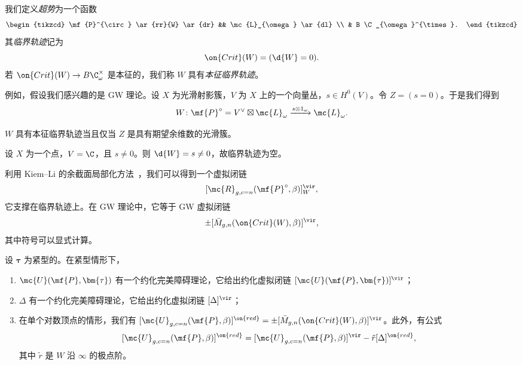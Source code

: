 我们定义\textit{超势}为一个函数
\begin{equation*}
\begin{tikzcd}
    \mf{P}^{\circ} \ar{rr}{W} \ar{dr} && \mc{L}_{\omega} \ar{dl} \\
    & B \C_{\omega}^{\times}.
\end{tikzcd}
\end{equation*}
其\textit{临界轨迹}记为
\[ \on{Crit}(W) = (\d{W} = 0). \]
若 \(\on{Crit}(W) \to B\C_{\omega}^{\times}\) 是本征的，我们称 \(W\) 具有\textit{本征临界轨迹}。

例如，假设我们感兴趣的是 GW 理论。设 \(X\) 为光滑射影簇，\(V\) 为 \(X\) 上的一个向量丛，\(s \in H^0(V)\)。令 \(Z = (s = 0)\)。于是我们得到
\[ W \colon \mf{P}^{\circ} = V^{\vee} \boxtimes \mc{L}_{\omega} \xrightarrow{s \otimes 1_{\omega}} \mc{L}_{\omega}. \]

\begin{lem}
    \(W\) 具有本征临界轨迹当且仅当 \(Z\) 是具有期望余维数的光滑簇。
\end{lem}

\begin{exm}
    设 \(X\) 为一个点，\(V = \C\)，且 \(s \neq 0\)。则 \(\d{W} = s \neq 0\)，故临界轨迹为空。
\end{exm}

利用 Kiem--Li 的余截面局部化方法~\cite{KiemLi2013}，我们可以得到一个虚拟闭链
\[ [\mc{R}_{g, c=n}(\mf{P}^{\circ}, \beta)]_W^{\vir}, \]
它支撑在临界轨迹上。在 GW 理论中，它等于 GW 虚拟闭链
\[ \pm [\bar{M}_{g,n}(\on{Crit}(W), \beta)]^{\vir}, \]
其中符号可以显式计算。

\begin{thm}
    设 \(\bm{\tau}\) 为紧型的。在紧型情形下，
    \begin{enumerate}
        \item \(\mc{U}(\mf{P}, \bm{\tau})\) 有一个约化完美障碍理论，它给出约化虚拟闭链 \([\mc{U}(\mf{P}, \bm{\tau})]^{\vir}\)；
        \item \(\Delta\) 有一个约化完美障碍理论，它给出约化虚拟闭链 \([\Delta]^{\vir}\)；
        \item 在单个对数顶点的情形，我们有 \([\mc{U}_{g, c=n}(\mf{P}, \beta)]^{\on{red}} = \pm [\bar{M}_{g,n}(\on{Crit}(W), \beta)]^{\vir}\)。此外，有公式
            \[ [\mc{U}_{g, c=n}(\mf{P}, \beta)]^{\on{red}} = [\mc{U}_{g, c=n}(\mf{P}, \beta)]^{\vir} - \tilde{r} [\Delta]^{\on{red}}, \]
            其中 \(\tilde{r}\) 是 \(W\) 沿 \(\infty\) 的极点阶。
    \end{enumerate}
\end{thm}

